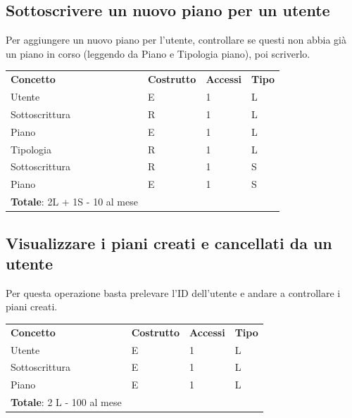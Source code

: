 \documentclass[a4paper,12pt]{report}
\begin{document}
\subsection*{Sottoscrivere un nuovo piano per un utente}

Per aggiungere un nuovo piano per l'utente, controllare se questi non abbia già un piano in corso (leggendo da Piano e Tipologia piano), poi scriverlo.

\begin{table}[!htb]
\begin{center}
	\begin{tabular}{ | m{5cm} P{4cm} P{4cm} P{4cm} | }
	\textbf{Concetto} & \textbf{Costrutto} & \textbf{Accessi} & \textbf{Tipo} \\
	Utente         & E & 1 & L \\ \hline
	Sottoscrittura & R & 1 & L \\ \hline
	Piano          & E & 1 & L \\ \hline
	Tipologia      & R & 1 & L \\ \hline
	Sottoscrittura & R & 1 & S \\ \hline
	Piano          & E & 1 & S \\ \hline
	\textbf{Totale}: 2L + 1S - 10 al mese & & & \\
	\hline
	\end{tabular}
\end{center}
\end{table}

\subsection*{Visualizzare i piani creati e cancellati da un utente}

Per questa operazione basta prelevare l'ID dell'utente e andare a controllare i piani creati.

\begin{table}[!htb]
\begin{center}
	\begin{tabular}{ | m{5cm} P{4cm} P{4cm} P{4cm} | }
	\textbf{Concetto} & \textbf{Costrutto} & \textbf{Accessi} & \textbf{Tipo} \\
	Utente         & E & 1 & L \\ \hline
	Sottoscrittura & E & 1 & L \\ \hline
	Piano 		 & E & 1 & L \\ \hline
	\textbf{Totale}: 2 L - 100 al mese & & & \\
	\hline
	\end{tabular}
\end{center}
\end{table}
\end{document}

